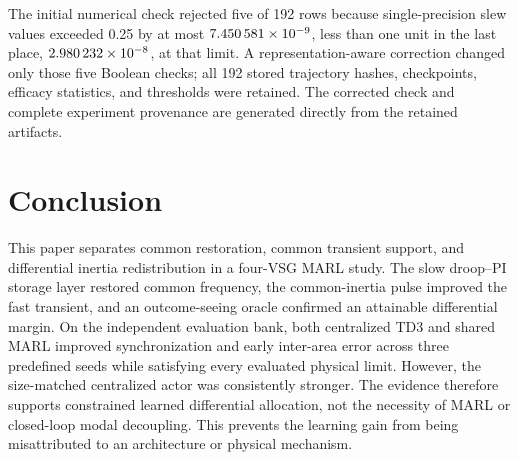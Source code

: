 \documentclass[conference,a4paper]{IEEEtran}
\begin{document}
The initial numerical check rejected five of 192 rows because single-precision
slew values exceeded 0.25 by at most \(\num{7.450581e-09}\), less than one
unit in the last place, \(\num{2.980232e-08}\), at that limit. A
representation-aware correction changed only those five Boolean checks; all
192 stored trajectory hashes, checkpoints, efficacy statistics, and thresholds
were retained. The corrected check and complete experiment provenance are
generated directly from the retained artifacts.

\section{Conclusion}

This paper separates common restoration, common transient support, and
differential inertia redistribution in a four-VSG MARL study. The slow
droop--PI storage layer restored common frequency, the common-inertia pulse
improved the fast transient, and an outcome-seeing oracle confirmed an
attainable differential margin. On the independent evaluation bank, both
centralized TD3 and shared MARL improved synchronization and early inter-area
error across three predefined seeds while satisfying every evaluated physical
limit.
However, the size-matched centralized actor was consistently stronger. The
evidence therefore supports constrained learned differential allocation, not
the necessity of MARL or closed-loop modal decoupling. This prevents the
learning gain from being misattributed to an architecture or physical
mechanism.



\end{document}
